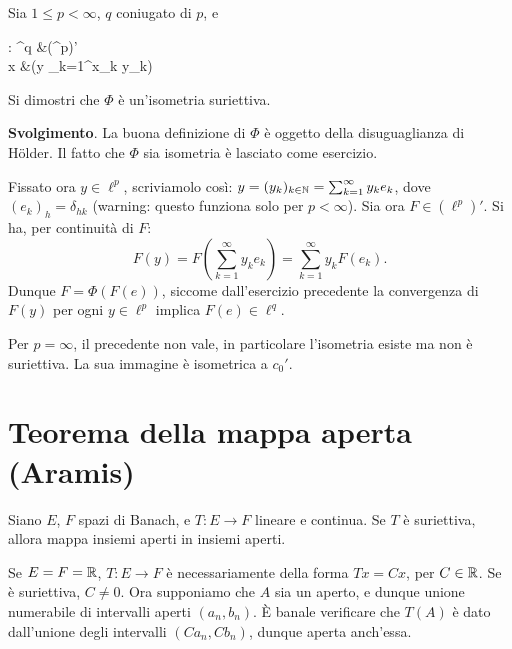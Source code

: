 \begin{exercise}
\label{ex:ellp_iso_ellq}
	Sia $1 \leq p < \infty$, $q$ coniugato di $p$, e
	\begin{eqalign*}
		\Phi : \ell^q &\longto (\ell^p)'\\
			x &\longmapsto (y \mapsto \sum_{k=1}^\infty x_k y_k)
	\end{eqalign*}
	Si dimostri che $\Phi$ è un'isometria suriettiva.

	\textbf{Svolgimento}. La buona definizione di $\Phi$ è oggetto della disuguaglianza di H\"older. Il fatto che $\Phi$ sia isometria è lasciato come esercizio.

	Fissato ora $y \in \ell^p$, scriviamolo così: $y=(y_k)_{k \in \mathbb{N}} = \sum_{k=1}^\infty y_k e_k$, dove $(e_k)_h = \delta_{hk}$ (warning: questo funziona solo per $p < \infty$). Sia ora $F \in (\ell^p)'$. Si ha, per continuità di $F$:
	\begin{equation*}
		F(y) = F({\textstyle \sum_{k=1}^\infty} y_k e_k) = \sum_{k=1}^\infty y_k F(e_k).
	\end{equation*}
	Dunque $F = \Phi(F(e))$, siccome dall'esercizio precedente la convergenza di $F(y)$ per ogni $y \in \ell^p$ implica $F(e) \in \ell^q$.
\end{exercise}

\begin{remark}
	Per $p=\infty$, il precedente non vale, in particolare l'isometria esiste ma non è suriettiva. La sua immagine è isometrica a $c_0'$.
\end{remark}

\section{Teorema della mappa aperta (Aramis)}
\begin{theorem}
	Siano $E$, $F$ spazi di Banach, e $T : E \to F$ lineare e continua. Se $T$ è suriettiva, allora mappa insiemi aperti in insiemi aperti.
\end{theorem}

\begin{example}
	Se $E = F = \mathbb{R}$, $T : E \to F$ è necessariamente della forma $Tx = Cx$, per $C \in \mathbb{R}$. Se è suriettiva, $C \neq 0$. Ora supponiamo che $A$ sia un aperto, e dunque unione numerabile di intervalli aperti $(a_n, b_n)$. È banale verificare che $T(A)$ è dato dall'unione degli intervalli $(Ca_n, Cb_n)$, dunque aperta anch'essa.
\end{example}

